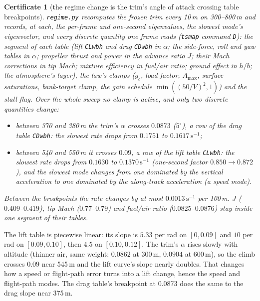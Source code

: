 \documentclass[11pt]{article}
\newtheorem{cert}{Certificate}
\begin{document}
\begin{cert}[the regime change is the trim's angle of attack crossing table breakpoints]\label{cert:regime}
\texttt{regime.py} recomputes the frozen trim every 10\,m on 300--800\,m and records, at each, the per-frame and one-second eigenvalues, the slowest mode's eigenvector, and every discrete quantity one frame reads (\texttt{tsmap} command \texttt{D}): the segment of each table (lift \texttt{CLwbh} and drag \texttt{CDwbh} in $\alpha$; the side-force, roll and yaw tables in $\alpha$; propeller thrust and power in the advance ratio $J$; their Mach corrections in tip Mach; mixture efficiency in fuel/air ratio; ground effect in $h/b$; the atmosphere's layer), the law's clamps ($g_c$, load factor, $A_{\max}$, surface saturations, bank-target clamp, the gain schedule $\min((50/V)^2, 1)$) and the stall flag. Over the whole sweep no clamp is active, and only two discrete quantities change:
\begin{itemize}
\item between 370 and 380\,m the trim's $\alpha$ crosses $0.0873$ ($5^\circ$), a row of the drag table \texttt{CDwbh}: the slowest rate drops from $0.1751$ to $0.1617\,\mathrm{s}^{-1}$;
\item between 540 and 550\,m it crosses $0.09$, a row of the lift table \texttt{CLwbh}: the slowest rate drops from $0.1630$ to $0.1370\,\mathrm{s}^{-1}$ (one-second factor $0.850 \to 0.872$), and the slowest mode changes from one dominated by the vertical acceleration to one dominated by the along-track acceleration (a speed mode).
\end{itemize}
Between the breakpoints the rate changes by at most $0.0013\,\mathrm{s}^{-1}$ per 100\,m. $J$ ($0.409$--$0.419$), tip Mach ($0.77$--$0.79$) and fuel/air ratio ($0.0825$--$0.0876$) stay inside one segment of their tables.
\end{cert}

The lift table is piecewise linear: its slope is $5.33$ per rad on $[0, 0.09]$ and $10$ per rad on $[0.09, 0.10]$, then $4.5$ on $[0.10, 0.12]$. The trim's $\alpha$ rises slowly with altitude (thinner air, same weight: $0.0862$ at 300\,m, $0.0904$ at 600\,m), so the climb crosses $0.09$ near 545\,m and the lift curve's slope nearly doubles. That changes how a speed or flight-path error turns into a lift change, hence the speed and flight-path modes. The drag table's breakpoint at $0.0873$ does the same to the drag slope near 375\,m.
\end{document}
